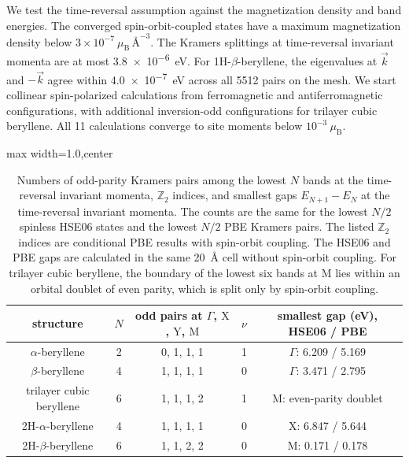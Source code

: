 We test the time-reversal assumption against the magnetization density and band energies.
The converged spin-orbit-coupled states have a maximum magnetization density below $3\times10^{-7}~\mu_{\mathrm{B}}\,\text{\AA}^{-3}$.
The Kramers splittings at time-reversal invariant momenta are at most \qty{3.8e-6}{\electronvolt}.
For 1H-$\beta$-beryllene, the eigenvalues at $\vec{k}$ and $-\vec{k}$ agree within \qty{4.0e-7}{\electronvolt} across all 5512 pairs on the mesh.
We start collinear spin-polarized calculations from ferromagnetic and antiferromagnetic configurations, with additional inversion-odd configurations for trilayer cubic beryllene.
All 11 calculations converge to site moments below $10^{-3}~\mu_{\mathrm{B}}$.

\begin{table}[!htbp]
\centering
{}
\begin{adjustbox}{max width=1.0\linewidth,center}
\begin{tabular}{ccccc}
\hline
\rowcolor{gray!25}
structure
& $N$
& odd pairs at $\Gamma$, $\mathrm{X}$, $\mathrm{Y}$, $\mathrm{M}$
& $\nu$
& smallest gap (eV), HSE06 / PBE \\
\hline
$\alpha$-beryllene & 2 & 0, 1, 1, 1 & 1 & $\Gamma$: 6.209 / 5.169 \\
$\beta$-beryllene & 4 & 1, 1, 1, 1 & 0 & $\Gamma$: 3.471 / 2.795 \\
trilayer cubic beryllene & 6 & 1, 1, 1, 2 & 1 & $\mathrm{M}$: even-parity doublet \\
2H-$\alpha$-beryllene & 4 & 1, 1, 1, 1 & 0 & $\mathrm{X}$: 6.847 / 5.644 \\
2H-$\beta$-beryllene & 6 & 1, 1, 2, 2 & 0 & $\mathrm{M}$: 0.171 / 0.178 \\
\hline
\end{tabular}
\end{adjustbox}
\caption{Numbers of odd-parity Kramers pairs among the lowest $N$ bands at the time-reversal invariant momenta,
$\mathbb{Z}_2$ indices,
and smallest gaps $E_{N+1}-E_{N}$ at the time-reversal invariant momenta.
The counts are the same for the lowest $N/2$ spinless HSE06 states and the lowest $N/2$ PBE Kramers pairs.
The listed $\mathbb{Z}_2$ indices are conditional PBE results with spin-orbit coupling.
The HSE06 and PBE gaps are calculated in the same \qty{20}{\angstrom} cell without spin-orbit coupling.
For trilayer cubic beryllene,
the boundary of the lowest six bands at $\mathrm{M}$ lies within an orbital doublet of even parity,
which is split only by spin-orbit coupling.}
\label{tab:proj3_hse_parity}
\end{table}

